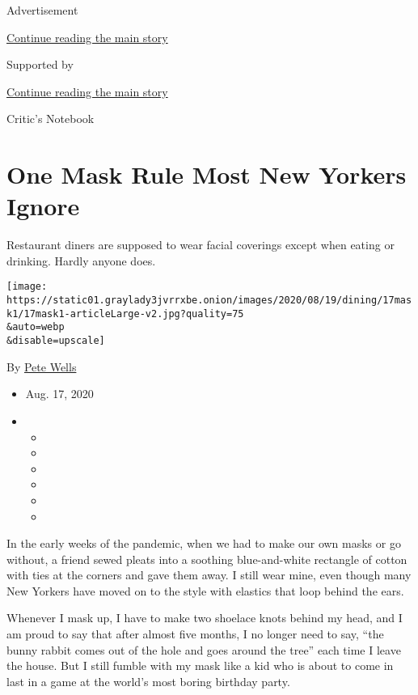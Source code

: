 Advertisement

\protect\hyperlink{after-top}{Continue reading the main story}

Supported by

\protect\hyperlink{after-sponsor}{Continue reading the main story}

Critic's Notebook

\hypertarget{one-mask-rule-most-new-yorkers-ignore}{%
\section{One Mask Rule Most New Yorkers
Ignore}\label{one-mask-rule-most-new-yorkers-ignore}}

Restaurant diners are supposed to wear facial coverings except when
eating or drinking. Hardly anyone does.

\texttt{[image: https://static01.graylady3jvrrxbe.onion/images/2020/08/19/dining/17mask1/17mask1-articleLarge-v2.jpg?quality=75\\\&auto=webp\\\&disable=upscale]}

By \href{https://www.nytimes3xbfgragh.onion/by/pete-wells}{Pete Wells}

\begin{itemize}
\item
  Aug. 17, 2020
\item
  \begin{itemize}
  \item
  \item
  \item
  \item
  \item
  \item
  \end{itemize}
\end{itemize}

In the early weeks of the pandemic, when we had to make our own masks or
go without, a friend sewed pleats into a soothing blue-and-white
rectangle of cotton with ties at the corners and gave them away. I still
wear mine, even though many New Yorkers have moved on to the style with
elastics that loop behind the ears.

Whenever I mask up, I have to make two shoelace knots behind my head,
and I am proud to say that after almost five months, I no longer need to
say, ``the bunny rabbit comes out of the hole and goes around the tree''
each time I leave the house. But I still fumble with my mask like a kid
who is about to come in last in a game at the world's most boring
birthday party.

